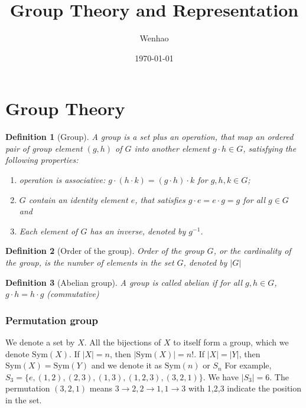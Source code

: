 \documentclass{amsart}
\newtheorem{definition}{Definition}
\begin{document}
\title{Group Theory and Representation}
\author{Wenhao}
\date{\today}
\maketitle

\section{Group Theory}
\begin{definition}[Group]
    A group is a set plus an operation, that map an ordered pair of group element $(g,h)$ of $G$ into another element $g\cdot h \in G$, satisfying
    the following properties:
    \begin{enumerate}
        \item operation is associative: $g\cdot (h \cdot k) = (g\cdot h) \cdot k$ for $g,h,k \in G$;
        \item $G$ contain an identity element $e$, that satisfies $g\cdot e = e\cdot g = g$ for all $g \in G$ and 
        \item Each element of $G$ has an inverse, denoted by $g^{-1}$.
    \end{enumerate}  
\end{definition}

\begin{definition}[Order of the group]
    Order of the group $G$, or the cardinality of the group, is the number of elements in the set $G$, denoted by $|G|$
\end{definition}

\begin{definition}[Abelian group]
    A group is called abelian if for all $g, h \in G$, $g\cdot h = h \cdot g$ (commutative)    
\end{definition}

\vspace{10pt}

\subsubsection*{Permutation group}
We denote a set by $X$. All the bijections of $X$ to itself form a group, which we denote $\text{Sym}(X)$. 
If $|X| = n$, then $|\text{Sym}(X)| = n!$.
If $|X| = |Y|$, then $\text{Sym}(X) = \text{Sym}(Y)$ and we denote it as $\text{Sym}(n)$ or $S_n$
For example, $S_3 = \{ e, (1,2), (2,3), (1,3), (1,2,3), (3,2,1) \}$. We have $|S_3| = 6$. 
The permutation $(3,2,1)$ means $3\to 2, 2\to 1, 1\to 3$ with 1,2,3 indicate the position in the set.
\end{document}
